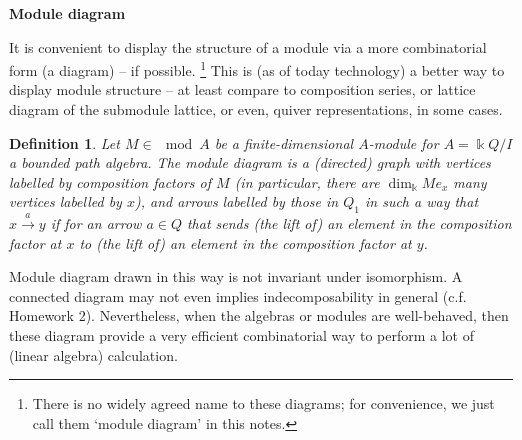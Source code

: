 \documentclass[11pt,a4paper]{article}
\numberwithin{equation}{section}
\theoremstyle{all}
\newtheorem{definition}[theorem]{Definition}
\theoremstyle{remark}
\newcommand{\defn}[1]{\textsl{\color{darkblue} #1}}
\begin{document}
\iffalse
\pagebreak

{\bf Module diagram}

It is convenient to display the structure of a module via a more combinatorial form (a diagram) -- if possible. \footnote{There is no widely agreed name to these diagrams; for convenience, we just call them `module diagram' in this notes.}
This is (as of today technology) a better way to display module structure -- at least compare to composition series, or lattice diagram of the submodule lattice, or even, quiver representations, in some cases. 


\begin{definition}

Let $M\in \mod A$ be a finite-dimensional $A$-module for $A=\Bbbk Q/I$ a bounded path algebra.
The \defn{module diagram} is a (directed) graph with vertices labelled by composition factors of $M$ (in particular, there are $\dim_{\Bbbk} Me_x$ many vertices labelled by $x$), and arrows labelled by those in $Q_1$ in such a way that $x\xrightarrow{a}y$ if for an arrow $a\in Q$ that sends (the lift of) an element in the composition factor at $x$ to (the lift of) an element in the composition factor at $y$.
\end{definition}

Module diagram drawn in this way is not invariant under isomorphism.  A connected diagram may not even implies indecomposability in general (c.f. Homework 2).  Nevertheless, when the algebras or modules are well-behaved, then these diagram provide a very efficient combinatorial way to perform a lot of (linear algebra) calculation.
\end{document}
